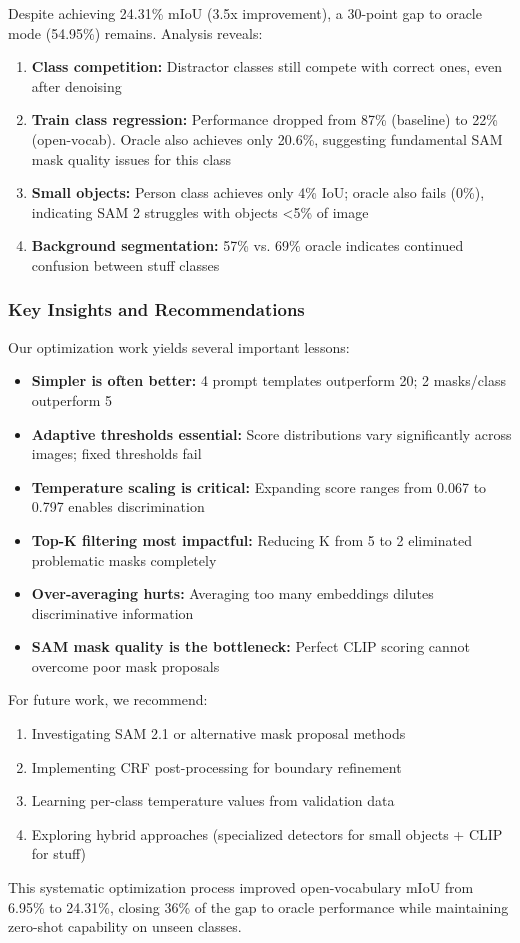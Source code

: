 Despite achieving 24.31\% mIoU (3.5x improvement), a 30-point gap to oracle mode (54.95\%) remains. Analysis reveals:

\begin{enumerate}
    \item \textbf{Class competition:} Distractor classes still compete with correct ones, even after denoising
    \item \textbf{Train class regression:} Performance dropped from 87\% (baseline) to 22\% (open-vocab). Oracle also achieves only 20.6\%, suggesting fundamental SAM mask quality issues for this class
    \item \textbf{Small objects:} Person class achieves only 4\% IoU; oracle also fails (0\%), indicating SAM 2 struggles with objects <5\% of image
    \item \textbf{Background segmentation:} 57\% vs. 69\% oracle indicates continued confusion between stuff classes
\end{enumerate}

\subsubsection{Key Insights and Recommendations}

Our optimization work yields several important lessons:

\begin{itemize}
    \item \textbf{Simpler is often better:} 4 prompt templates outperform 20; 2 masks/class outperform 5
    \item \textbf{Adaptive thresholds essential:} Score distributions vary significantly across images; fixed thresholds fail
    \item \textbf{Temperature scaling is critical:} Expanding score ranges from 0.067 to 0.797 enables discrimination
    \item \textbf{Top-K filtering most impactful:} Reducing K from 5 to 2 eliminated problematic masks completely
    \item \textbf{Over-averaging hurts:} Averaging too many embeddings dilutes discriminative information
    \item \textbf{SAM mask quality is the bottleneck:} Perfect CLIP scoring cannot overcome poor mask proposals
\end{itemize}

For future work, we recommend:
\begin{enumerate}
    \item Investigating SAM 2.1 or alternative mask proposal methods
    \item Implementing CRF post-processing for boundary refinement
    \item Learning per-class temperature values from validation data
    \item Exploring hybrid approaches (specialized detectors for small objects + CLIP for stuff)
\end{enumerate}

This systematic optimization process improved open-vocabulary mIoU from 6.95\% to 24.31\%, closing 36\% of the gap to oracle performance while maintaining zero-shot capability on unseen classes.
